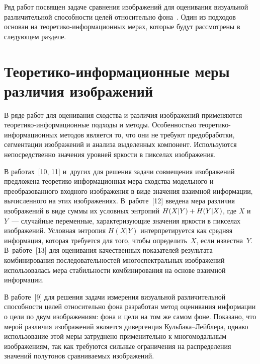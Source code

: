 \begin{multicols}{2}
  Ряд работ посвящен задаче сравнения изображений для оценивания визуальной 
различительной способности целей относительно фона~\cite{9mur}. Один из подходов 
основан на тео\-ре\-ти\-ко-ин\-фор\-ма\-ци\-он\-ных мерах, которые будут рассмотрены в 
следующем разделе.

\section{Теоретико-информационные меры различия изображений}
  
  В ряде работ для оценивания сходства и различия изображений применяются 
  тео\-ре\-ти\-ко-ин\-фор\-ма\-ци\-он\-ные подходы и методы. Особенностью 
  тео\-ре\-ти\-ко-информационных методов является то, что они не требуют 
  предобработки, сегментации 
изоб\-ра\-же\-ний и анализа выделенных компонент. Используются непосредственно значения 
уровней яркости в пикселах изображения.
  
  В работах~[10, 11] и~других для решения задачи совмещения изображений предложена 
  тео\-ре\-ти\-ко-ин\-фор\-ма\-ци\-он\-ная мера сходства модельного и преобразованного 
входного изображения в виде значения взаимной информации, вычисленного на этих 
изображениях. В~работе~[12] введена мера различия изображений в виде суммы их 
условных энтропий $H(X\vert Y)\hm+H(Y\vert X)$, где $X$ и~$Y$~--- случайные 
переменные, характеризующие значения яркости в пикселах изображений. Условная 
энтропия $H(X\vert Y)$ интерпретируется как средняя информация, которая требуется для 
того, чтобы определить~$X$, если известна~$Y$. В~работе~[13] для оценивания 
качественных показателей результата комбинирования последовательностей 
многоспектральных изображений использовалась мера стабильности комбинирования на 
основе взаимной информации.
  
  В работе~[9] для решения задачи измерения визуальной различительной способности 
целей относительно фона разработан метод оценивания информации о цели по двум 
изображениям: фона и цели на том же самом фоне. Показано, что мерой различия 
изображений является дивергенция Куль\-ба\-ка--Лейб\-ле\-ра, однако использование этой 
меры затруднено применительно к многомодальным изображениям, так как требуются 
сильные ограничения на распределения значений полутонов сравниваемых изображений. 
  

\end{multicols}
